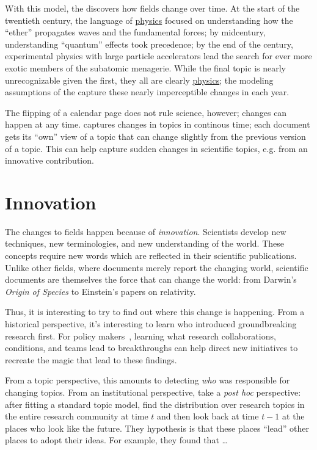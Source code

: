 With this model, the  discovers how fields change over
time.  At the start of the twentieth century, the language of
\underline{physics} focused on understanding how the ``ether''
propagates waves and the fundamental forces; by midcentury,
understanding ``quantum'' effects took precedence; by the end of the
century, experimental physics with large particle accelerators lead
the search for ever more exotic members of the subatomic menagerie.
While the final topic is nearly unrecognizable given the first, they
all are clearly \underline{physics}; the modeling assumptions of the
 capture these nearly imperceptible changes in each year.

The flipping of a calendar page does not rule science, however;
changes can happen at any time.  \citet{wang-08} captures changes in
topics in continous time; each document gets its ``own'' view of a
topic that can change slightly from the previous version of a topic.
This can help capture sudden changes in scientific topics, e.g. from
an innovative contribution.


\section{Innovation}

The changes to fields happen because of \emph{innovation}.  Scientists develop
new techniques, new terminologies, and new understanding of the world.  These
concepts require new words which are reflected in their scientific
publications.  Unlike other fields, where documents merely report the changing
world, scientific documents are themselves the force that can change the world:
from Darwin's \textit{Origin of Species} to Einstein's papers on relativity.

Thus, it is interesting to try to find out where this change is happening.  From
a historical perspective, it's interesting to learn who introduced
groundbreaking research first.  For policy makers~\citep{largent-12}, learning
what research collaborations, conditions, and teams lead to breakthroughs can
help direct new initiatives to recreate the magic that lead to these findings.

From a topic perspective, this amounts to detecting \emph{who} was responsible
for changing topics.  From an institutional perspective, \citet{ramage-10} take
a \textit{post hoc} perspective: after fitting a standard  topic model,
find the distribution over research topics in the entire research community at
time $t$ and then look back at time $t-1$ at the places who look like the
future.  They hypothesis is that these places ``lead'' other places to adopt
their ideas.  For example, they found that \dots

